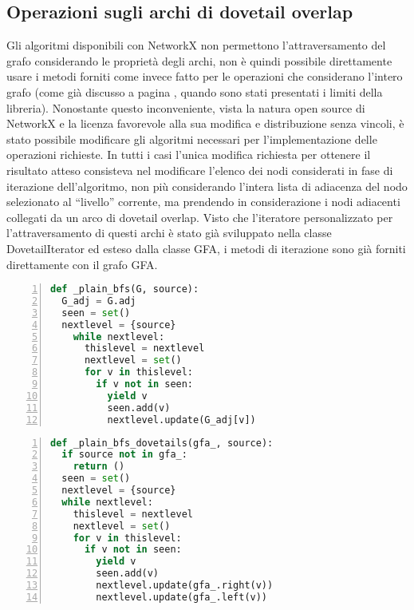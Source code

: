 \subsection{Operazioni sugli archi di dovetail overlap}
Gli algoritmi disponibili con NetworkX non permettono l'attraversamento
del grafo considerando le proprietà degli archi, non è quindi possibile
direttamente usare i metodi forniti come invece fatto per le operazioni
che considerano l'intero grafo (come già discusso a pagina \pageref{sec:nx-why-limits},
quando sono stati presentati i limiti della libreria). Nonostante questo inconveniente, vista
la natura open source di NetworkX e la licenza favorevole alla sua modifica
e distribuzione senza vincoli, è stato possibile modificare gli algoritmi necessari
per l'implementazione delle operazioni richieste. In tutti i casi l'unica modifica
richiesta per ottenere il risultato atteso consisteva nel modificare
l'elenco dei nodi considerati in fase di iterazione dell'algoritmo,
non più considerando l'intera lista di adiacenza del nodo selezionato
al ``livello'' corrente, ma prendendo in considerazione i nodi adiacenti
collegati da un arco di dovetail overlap. Visto che l'iteratore personalizzato
per l'attraversamento di questi archi è stato già sviluppato nella classe
DovetailIterator ed esteso dalla classe GFA, i metodi di iterazione
sono già forniti direttamente con il grafo GFA.

\noindent
\begin{lstlisting}[boxpos=t, numbers=left, language=Python, frame=t, caption=BFS in networkx., label=code:bfs-nx]
def _plain_bfs(G, source):
  G_adj = G.adj
  seen = set()
  nextlevel = {source}
    while nextlevel:
      thislevel = nextlevel
      nextlevel = set()
      for v in thislevel:
        if v not in seen:
          yield v
          seen.add(v)
          nextlevel.update(G_adj[v])
\end{lstlisting}

\captionsetup{justification=centering}
\begin{lstlisting}[boxpos=t, language=Python, numbers=left, frame=t, caption=BFS in \pygfa., label=code:bfs-pygfa]
def _plain_bfs_dovetails(gfa_, source):
  if source not in gfa_:
    return ()
  seen = set()
  nextlevel = {source}
  while nextlevel:
    thislevel = nextlevel
    nextlevel = set()
    for v in thislevel:
      if v not in seen:
        yield v
        seen.add(v)
        nextlevel.update(gfa_.right(v))
        nextlevel.update(gfa_.left(v))
\end{lstlisting}

